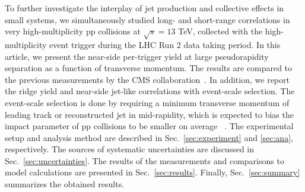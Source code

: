 To further investigate the interplay of jet production and collective effects in small systems, we simultaneously studied long- and short-range correlations in very high-multiplicity pp collisions at $\sqrt{s} =13$ TeV, collected with the high-multiplicity event trigger during the LHC Run 2 data taking period. In this article, we present the near-side per-trigger yield at large pseudorapidity separation as a function of transverse momentum. The results are compared to the previous measurements by the CMS collaboration~\cite{Khachatryan:2015lva}. %
In addition, we report the ridge yield and near-side jet-like correlations with event-scale selection. The event-scale selection is done by requiring a minimum transverse momentum of leading track or reconstructed jet in mid-rapidity, which is expected to bias the impact parameter of pp collisions to be smaller on average ~\cite{Sjostrand:1986ep,Frankfurt:2010ea}.
The experimental setup and analysis method are described in Sec.~\ref{sec:experiment} and \ref{sec:ana}, respectively. The sources of systematic uncertainties are discussed in Sec.~\ref{sec:uncertainties}. The results of the measurements and comparisons to model calculations are presented in Sec.~\ref{sec:results}. Finally, Sec.~\ref{sec:summary} summarizes the obtained results.



